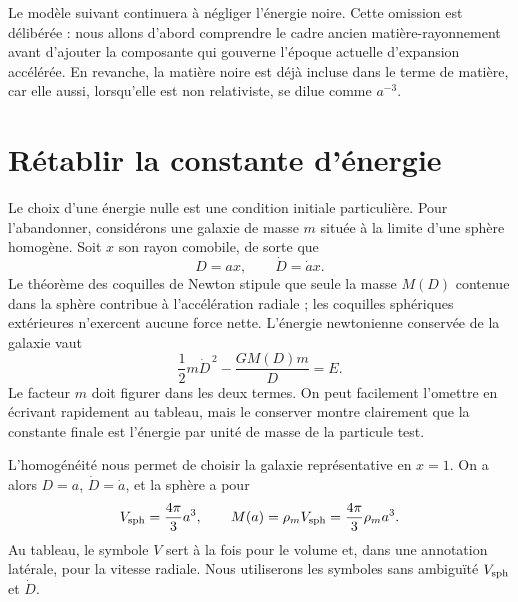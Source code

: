Le modèle suivant continuera à négliger l’énergie noire. Cette omission est délibérée : nous allons d’abord comprendre le cadre ancien matière-rayonnement avant d’ajouter la composante qui gouverne l’époque actuelle d’expansion accélérée. En revanche, la matière noire est déjà incluse dans le terme de matière, car elle aussi, lorsqu’elle est non relativiste, se dilue comme \(a^{-3}\).

\begin{classroomqa}
\end{classroomqa}

\section{Rétablir la constante d’énergie}

Le choix d’une énergie nulle est une condition initiale particulière. Pour l’abandonner, considérons une galaxie de masse \(m\) située à la limite d’une sphère homogène. Soit \(x\) son rayon comobile, de sorte que
\begin{equation}
D=ax,
\qquad
\dot D=\dot a x.
\label{eq:c02-comoving-particle}
\end{equation}
Le théorème des coquilles de Newton stipule que seule la masse \(M(D)\) contenue dans la sphère contribue à l’accélération radiale ; les coquilles sphériques extérieures n’exercent aucune force nette. L’énergie newtonienne conservée de la galaxie vaut
\begin{equation}
\frac{1}{2}m\dot D^{\,2}-\frac{GM(D)m}{D}=E.
\label{eq:c02-newton-energy}
\end{equation}
Le facteur \(m\) doit figurer dans les deux termes. On peut facilement l’omettre en écrivant rapidement au tableau, mais le conserver montre clairement que la constante finale est l’énergie par unité de masse de la particule test.

L’homogénéité nous permet de choisir la galaxie représentative en \(x=1\). On a alors \(D=a\), \(\dot D=\dot a\), et la sphère a pour
\begin{equation}
V_{\rm sph}=\frac{4\pi}{3}a^3,
\qquad
M(a)=\rho_m V_{\rm sph}=\frac{4\pi}{3}\rho_m a^3.
\label{eq:c02-enclosed-mass}
\end{equation}
Au tableau, le symbole \(V\) sert à la fois pour le volume et, dans une annotation latérale, pour la vitesse radiale. Nous utiliserons les symboles sans ambiguïté \(V_{\rm sph}\) et \(\dot D\).

